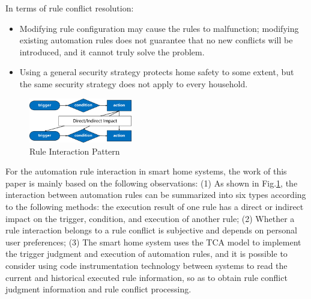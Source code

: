 In terms of rule conflict resolution:
\begin{itemize}
	\item Modifying rule configuration may cause the rules to malfunction; modifying existing automation rules does not guarantee that no new conflicts will be introduced, and it cannot truly solve the problem.
	
	\item Using a general security strategy protects home safety to some extent, but the same security strategy does not apply to every household.
\end{itemize}

\begin{figure}[htbp]
	\centering
	\includegraphics[width=0.4\textwidth]{figure/classification_observation.png}
	\caption{Rule Interaction Pattern}
	\label{classification_observation}
\end{figure}

For the automation rule interaction in smart home systems, the work of this paper is mainly based on the following observations: (1) As shown in Fig.\ref{classification_observation}, the interaction between automation rules can be summarized into six types according to the following methods: the execution result of one rule has a direct or indirect impact on the trigger, condition, and execution of another rule; (2) Whether a rule interaction belongs to a rule conflict is subjective and depends on personal user preferences; (3) The smart home system uses the TCA model to implement the trigger judgment and execution of automation rules, and it is possible to consider using code instrumentation technology between systems to read the current and historical executed rule information, so as to obtain rule conflict judgment information and rule conflict processing.


